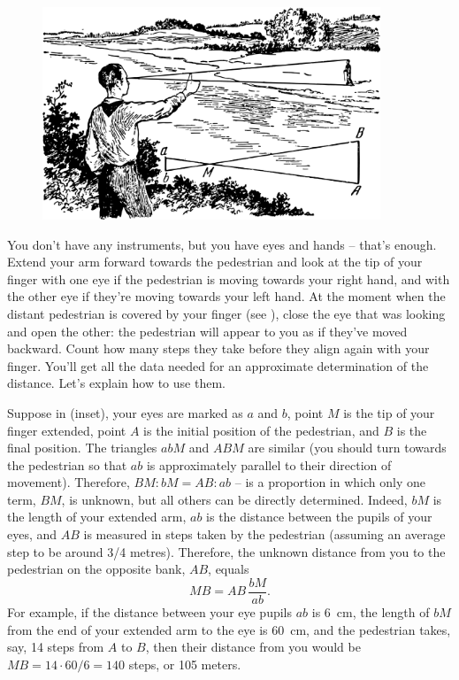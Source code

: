\begin{figure}[h!]
\centering
\includegraphics[width=0.9\textwidth]{figures/ch-02/fig-036.pdf}
\end{figure}


\ans You don't have any instruments, but you have eyes and hands -- that's enough. Extend your arm forward towards the pedestrian and look at the tip of your finger with one eye if the pedestrian is moving towards your right hand, and with the other eye if they're moving towards your left hand. At the moment when the distant pedestrian is covered by your finger (see ), close the eye that was looking and open the other: the pedestrian will appear to you as if they've moved backward. Count how many steps they take before they align again with your finger. You'll get all the data needed for an approximate determination of the distance. Let's explain how to use them.

Suppose in  (inset), your eyes are marked as $a$ and $b$, point $M$ is the tip of your finger extended, point $A$ is the initial position of the pedestrian, and $B$ is the final position. The triangles $abM$ and $ABM$ are similar (you should turn towards the pedestrian so that $ab$ is approximately parallel to their direction of movement). Therefore, $BM : bM = AB : ab$ -- is a proportion in which only one term, $BM$, is unknown, but all others can be directly determined. Indeed, $bM$ is the length of your extended arm, $ab$ is the distance between the pupils of your eyes, and $AB$ is measured in steps taken by the pedestrian (assuming an average step to be around 3/4 metres). Therefore, the unknown distance from you to the pedestrian on the opposite bank, $AB$, equals 
\begin{equation*}%
MB = AB \, \frac{bM}{ab}.
\end{equation*}
For example, if the distance between your eye pupils $ab$ is \SI{6}{\centi\meter}, the length of $bM$ from the end of your extended arm to the eye is \SI{60}{\centi\meter}, and the pedestrian takes, say, 14 steps from $A$ to $B$, then their distance from you would be $MB = 14 \cdot 60/6 = 140$ steps, or 105 meters.


